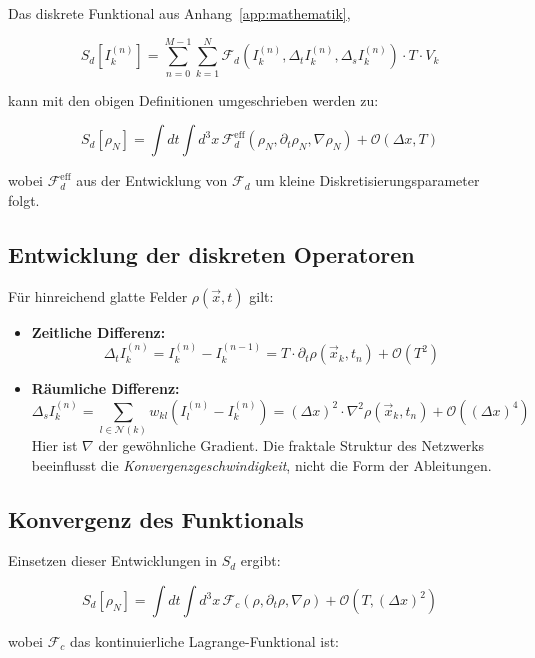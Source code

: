 Das diskrete Funktional aus Anhang~\ref{app:mathematik},

\[
S_d[I_k^{(n)}] = \sum_{n=0}^{M-1} \sum_{k=1}^N \mathcal{F}_d(I_k^{(n)}, \Delta_t I_k^{(n)}, \Delta_s I_k^{(n)}) \cdot T \cdot V_k
\]

kann mit den obigen Definitionen umgeschrieben werden zu:

\[
S_d[\rho_N] = \int dt \int d^3x \, \mathcal{F}_d^{\text{eff}}(\rho_N, \partial_t \rho_N, \nabla \rho_N) + \mathcal{O}(\Delta x, T)
\]

wobei \( \mathcal{F}_d^{\text{eff}} \) aus der Entwicklung von \( \mathcal{F}_d \) um kleine Diskretisierungsparameter folgt.

\subsection{Entwicklung der diskreten Operatoren}
\label{sub:kontinuumslimes_operatoren_entwicklung}

Für hinreichend glatte Felder \( \rho(\vec{x}, t) \) gilt:

\begin{itemize}
    \item \textbf{Zeitliche Differenz:}
          \[
          \Delta_t I_k^{(n)} = I_k^{(n)} - I_k^{(n-1)} = T \cdot \partial_t \rho(\vec{x}_k, t_n) + \mathcal{O}(T^2)
          \]

    \item \textbf{Räumliche Differenz:}
          \[
          \Delta_s I_k^{(n)} = \sum_{l \in \mathcal{N}(k)} w_{kl}(I_l^{(n)} - I_k^{(n)})
          = (\Delta x)^2 \cdot \nabla^2 \rho(\vec{x}_k, t_n) + \mathcal{O}((\Delta x)^4)
          \]
          Hier ist \( \nabla \) der gewöhnliche Gradient. Die fraktale Struktur des Netzwerks beeinflusst die \emph{Konvergenzgeschwindigkeit}, nicht die Form der Ableitungen.
\end{itemize}

\subsection{Konvergenz des Funktionals}
\label{sub:kontinuumslimes_funktional_grenzwert}

Einsetzen dieser Entwicklungen in \( S_d \) ergibt:

\[
S_d[\rho_N] = \int dt \int d^3x \, \mathcal{F}_c(\rho, \partial_t \rho, \nabla \rho) + \mathcal{O}(T, (\Delta x)^2)
\]

wobei \( \mathcal{F}_c \) das kontinuierliche Lagrange-Funktional ist:

